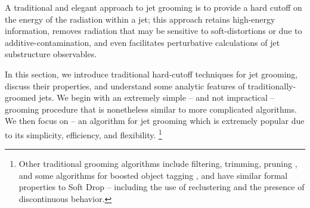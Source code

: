 




A traditional and elegant approach to jet grooming is to provide a hard cutoff on the energy of the radiation within a jet;
%
this approach retains high-energy information, removes radiation that may be sensitive to \glspl{soft-distortion} or due to \gls{additive-contamination}, and even facilitates perturbative calculations of jet substructure observables.


In this section, we introduce traditional hard-cutoff techniques for jet grooming, discuss their properties, and understand some analytic features of traditionally-groomed jets.
%
We begin with an extremely simple -- and not impractical -- grooming procedure that is nonetheless similar to more complicated algorithms.
%
We then focus on  -- an algorithm for jet grooming which is extremely popular due to its simplicity, efficiency, and flexibility.%
\footnote{
    Other traditional grooming algorithms include filtering, trimming, pruning \cite{Dasgupta:2013ihk}, and some algorithms for boosted object tagging \cite{CMS-PAS-JME-09-001}, and have similar formal properties to Soft Drop -- including the use of reclustering and the presence of discontinuous behavior.
}

